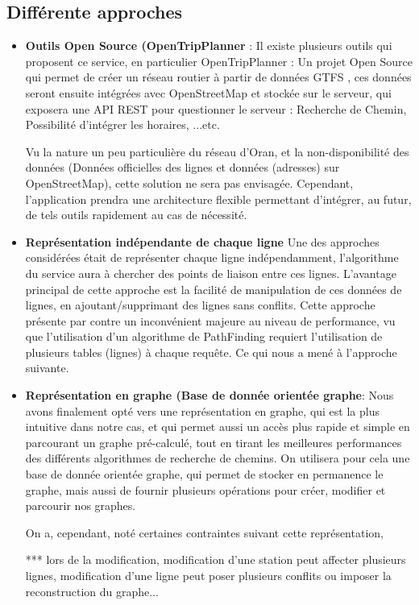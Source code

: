 \subsection{Différente approches}
\begin{itemize}
	\item \textbf{Outils Open Source (OpenTripPlanner} : 
	      Il existe plusieurs outils qui proposent ce service, en particulier OpenTripPlanner : Un projet Open Source qui permet de créer un réseau routier à partir de données GTFS , ces données seront ensuite intégrées avec OpenStreetMap et stockée sur le serveur, qui exposera une API REST pour questionner le serveur : Recherche de Chemin, Possibilité d'intégrer les horaires, ...etc.
	      		
	      Vu la nature un peu particulière du réseau d'Oran, et la non-disponibilité des données (Données officielles des lignes et données (adresses) sur OpenStreetMap), cette solution ne sera pas envisagée. 
	      Cependant, l'application prendra une architecture flexible permettant d'intégrer, au futur, de tels outils rapidement au cas de nécessité.
	\item \textbf{Représentation indépendante de chaque ligne}
	      Une des approches considérées était de représenter chaque ligne indépendamment, l'algorithme du service aura à chercher des points de liaison entre ces lignes.
	      L'avantage principal de cette approche est la facilité de manipulation de ces données de lignes, en ajoutant/supprimant des lignes sans conflits.
	      Cette approche présente par contre un inconvénient majeure au niveau de performance, vu que l'utilisation d'un algorithme de PathFinding requiert l'utilisation de plusieurs tables (lignes) à chaque requête. Ce qui nous a mené à l'approche suivante.
	\item \textbf{Représentation en graphe (Base de donnée orientée graphe}: Nous avons finalement opté vers une représentation en graphe, qui est la plus intuitive dans notre cas, et qui permet aussi un accès plus rapide et simple en parcourant un graphe pré-calculé, tout en tirant les meilleures performances des différents algorithmes de recherche de chemins.
	On utilisera pour cela une base de donnée orientée graphe, qui permet de stocker en permanence le graphe, mais aussi de fournir plusieurs opérations pour créer, modifier et parcourir nos graphes.
	
	On a, cependant, noté certaines contraintes suivant cette représentation, 
	
	*** lors de la modification, modification d'une station peut affecter plusieurs lignes, modification d'une ligne peut poser plusieurs conflits ou imposer la reconstruction du graphe...
	     
\end{itemize}
